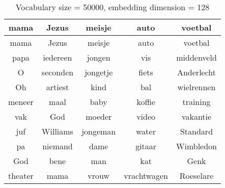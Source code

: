 \begin{table}[H]
\centering
\caption[Vocabulary size = 50000, embedding dimension = 128]{Vocabulary size = 50000, embedding dimension = 128}
\label{tab:emb_experiments}
\begin{tabular}{|c|c|c|c|c|}
\hline
mama & Jezus & meisje & auto & voetbal \\ \hline \hline
mama & Jezus & meisje & auto & voetbal\\
papa & iedereen & jongen & vis & middenveld\\
O & seconden & jongetje & fiets & Anderlecht\\
Oh & artiest & kind & bal & wielrennen\\
meneer & maal & baby & koffie & training\\
vak & God & moeder & video & vakantie\\
juf & Williams & jongeman & water & Standard\\
pa & niemand & dame & gitaar & Wimbledon\\
God & bene & man & kat & Genk\\
theater & mama & vrouw & vrachtwagen & Roeselare\\
\hline
\end{tabular}
\end{table}
